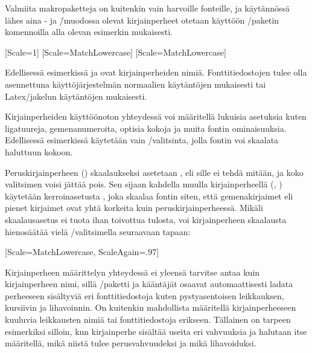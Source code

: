 Valmiita makropaketteja on kuitenkin vain harvoille fonteille, ja
käytännössä lähes aina - ja 
\=/muodossa olevat kirjainperheet otetaan käyttöön
\-/paketin komennoilla alla olevan esimerkin
mukaisesti.

\begin{koodilohkosis}
  \setmainfont{TeX Gyre Termes}[Scale=1]
  \setsansfont{TeX Gyre Heros} [Scale=MatchLowercase]
  \setmonofont{TeX Gyre Cursor}[Scale=MatchLowercase]
\end{koodilohkosis}

Edellisessä esimerkissä  ja
 ovat kirjainperheiden nimiä. Fonttitiedostojen
tulee olla asennettuna käyttöjärjestelmän normaalien käytäntöjen
mukaisesti tai Latex\-/jakelun käytäntöjen mukaisesti.

Kirjainperheiden käyttöönoton yhteydessä voi määritellä lukuisia
asetuksia kuten ligatuureja, gemenanumeroita, optisia kokoja ja muita
fontin ominaisuuksia. Edellisessä esimerkissä käytetään vain
\-/valitsinta, jolla fontin voi skaalata haluttuun kokoon.

Peruskirjainperheen () skaalaukseksi
asetetaan , eli sille ei tehdä mitään, ja koko valitsimen
voisi jättää pois. Sen sijaan kahdella muulla kirjainperheellä
(, ) käytetään
ker\-roin\-ase\-tus\-ta , joka skaalaa fontin
siten, että gemenakirjaimet eli pienet kirjaimet ovat yhtä korkeita kuin
peruskirjainperheessä. Mikäli skaa\-laus\-ase\-tus
 ei tuota ihan toivottua tulosta, voi
kirjainperheen skaalausta hienosäätää vielä
\-/valitsimella seuraavaan tapaan:

\begin{koodilohkosis}
  \setmonofont{TeX Gyre Cursor}
  [Scale=MatchLowercase, ScaleAgain=.97]
\end{koodilohkosis}

Kirjainperheen määrittelyn yhteydessä ei yleensä tarvitse antaa kuin
kirjainperheen nimi, sillä \-/paketti ja kääntäjät
osaavat automaattisesti ladata perheeseen sisältyviä eri
fonttitiedostoja kuten pysty\-asen\-toi\-sen leikkauksen, kursiivin ja
lihavoinnin. On kuitenkin mahdollista määritellä kirjainperheeseen
kuuluvia leikkausten nimiä tai fonttitiedostoja erikseen. Tällainen on
tarpeen esimerkiksi silloin, kun kirjainperhe sisältää useita eri
vahvuuksia ja halutaan itse määritellä, mikä niistä tulee
perusvahvuudeksi ja mikä lihavoiduksi.

